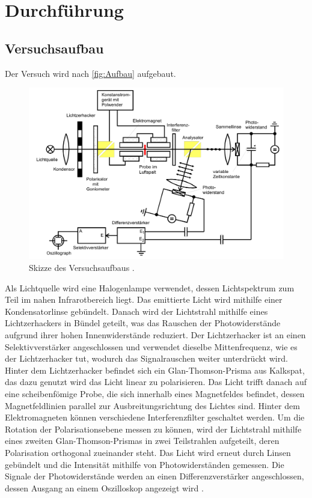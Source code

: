 \section{Durchführung}
\label{sec:Durchführung}

\subsection{Versuchsaufbau}
\label{subsec:Versuchsaufbau}

Der Versuch wird nach \autoref{fig:Aufbau} aufgebaut.
\begin{figure}[H]
	\centering
    \includegraphics[width=0.6\linewidth]{data/Versuchsaufbau.png}
	\caption{Skizze des Versuchsaufbaus \cite{Anleitung46}.}
	\label{fig:Aufbau}
\end{figure}

\noindent
Als Lichtquelle wird eine Halogenlampe verwendet, dessen Lichtspektrum zum Teil im nahen Infrarotbereich liegt. Das emittierte Licht wird mithilfe einer Kondensatorlinse gebündelt. 
Danach wird der Lichtstrahl mithilfe eines Lichtzerhackers in Bündel geteilt, was das Rauschen der Photowiderstände aufgrund ihrer hohen Innenwiderstände reduziert. Der 
Lichtzerhacker ist an einen Selektivverstärker angeschlossen und verwendet dieselbe Mittenfrequenz, wie es der Lichtzerhacker tut, wodurch das Signalrauschen weiter unterdrückt wird.
Hinter dem Lichtzerhacker befindet sich ein Glan-Thomson-Prisma aus Kalkspat, das dazu genutzt wird das Licht linear zu polarisieren.
Das Licht trifft danach auf eine scheibenfömige Probe, die sich innerhalb eines Magnetfeldes befindet, dessen Magnetfeldlinien parallel zur Ausbreitungsrichtung des Lichtes 
sind. Hinter dem Elektromagneten können verschiedene Interferenzfilter geschaltet werden. Um die Rotation der Polarisationsebene messen zu können, wird der Lichtstrahl mithilfe 
eines zweiten Glan-Thomson-Prismas in zwei Teilstrahlen aufgeteilt, deren Polarisation orthogonal zueinander steht. Das Licht wird erneut durch Linsen gebündelt und die Intensität
mithilfe von Photowiderständen gemessen. Die Signale der Photowiderstände werden an einen Differenzverstärker angeschlossen, dessen Ausgang an einem Oszilloskop angezeigt wird \cite{Anleitung46}.

